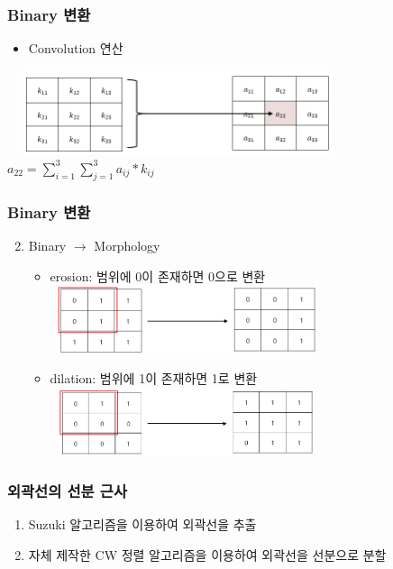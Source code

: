 \documentclass{beamer}
\begin{document}
	\begin{frame}{}
		\frametitle{Binary 변환}
		\begin{itemize}
			\item Convolution 연산
		\end{itemize}
		\includegraphics[width=10cm, height=2.5cm]{Convolution.png}
		\centering
		$ \displaystyle a_{22} = \sum_{i = 1}^{3} \sum_{j = 1}^{3} a_{ij} * k_{ij} $
	\end{frame}
	\begin{frame}{}
		\frametitle{Binary 변환}
		\begin{enumerate}
			\setcounter{enumi}{1}
			\item Binary $ \rightarrow $ Morphology
			\begin{itemize}
				\item erosion: 범위에 0이 존재하면 0으로 변환 \\
				\vspace{0.5em}
				\includegraphics[width=8cm, height=2cm]{Erosion.png}
				\item dilation: 범위에 1이 존재하면 1로 변환 \\
				\vspace{0.5em}
				\includegraphics[width=8cm, height=2cm]{Dilation.png}
			\end{itemize}
		\end{enumerate}	
	\end{frame}
	\begin{frame}{}
		\frametitle{외곽선의 선분 근사}
		\begin{enumerate}
			\item Suzuki 알고리즘을 이용하여 외곽선을 추출
			\item 자체 제작한 CW 정렬 알고리즘을 이용하여 외곽선을 선분으로 분할
		\end{enumerate}	
	\end{frame}
\end{document}
